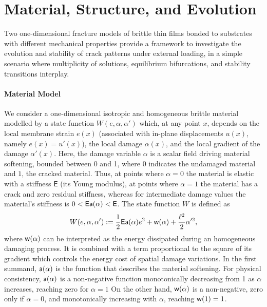 \section{Material, Structure, and Evolution}
\label{sec:rigid}
Two one-dimensional fracture models of brittle thin films bonded to substrates with different mechanical properties provide a framework to investigate the evolution and stability of crack patterns under external loading, in a  simple scenario where multiplicity of solutions, equilibrium bifurcations, and stability transitions interplay.

\paragraph{Material Model}
We consider a one-dimensional isotropic and homogeneous brittle material modelled by a state function $W(e, \alpha, \alpha')$ which, at any point $x$,
depends on the local membrane strain $e(x)$ (associated with  in-plane displacements $u(x)$, namely $e(x) = u'(x)$), the local damage $\alpha(x)$, and the local gradient of the damage $\alpha'(x)$.
Here, the damage variable $\alpha$ is a scalar field driving material softening, bounded between 0 and 1, where $0$ indicates the undamaged material and $1$, the cracked material. Thus, at points where $\alpha=0$ the material is elastic with a stiffness $\mathsf{E}$ (its Young modulus), at points where $\alpha=1$ the material has a crack and zero residual stiffness, whereas for intermediate damage values the material's stiffness is $0<\mathsf{E}\mathsf{a}(\alpha)< \mathsf{E}$.
The state function $W$ is defined as
\begin{equation}
    \label{def:energy_material}
    W(e, \alpha, \alpha'):= \frac{1}{2} \mathsf{E} \mathsf{a}(\alpha)e^2 +\mathsf{w}(\alpha) + \frac{\ell^2}{2}\alpha'^2,
\end{equation}
where $\mathsf{w}(\alpha)$ can be interpreted as the energy dissipated during an homogeneous damaging process. It is combined with a term proportional to the square of its gradient which controls the energy cost of spatial damage variations. In the first summand, $\mathsf{a}(\alpha)$ is the function that describes the material softening. %
For physical consistency, $\mathsf{a}(\alpha)$ is a non-negative function monotonically decreasing from 1 as $\alpha$ increases, reaching zero for $\alpha=1$
On the other hand, $\mathsf{w}(\alpha)$ is a non-negative, zero only if $\alpha=0$, and monotonically increasing with $\alpha$, reaching $\mathsf{w}(1)=1$.
